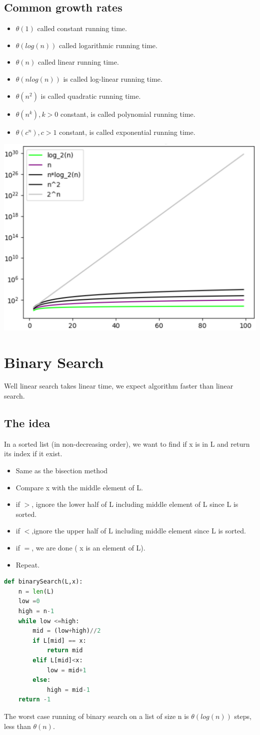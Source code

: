 \documentclass[12pt,oneside]{book}
\begin{document}
\subsection{Common growth rates}
\begin{itemize}
	\item $\theta(1)$ called constant running time.
	\item $\theta(log(n))$ called logarithmic running time.
	\item $\theta(n)$ called linear running time.
	\item $\theta(nlog(n))$ is called log-linear running time.
	\item $\theta(n^2)$ is called quadratic running time.
	\item $\theta(n^k),k>0$ constant, is called polynomial running time.
	\item $\theta(c^n),c>1$ constant, is called exponential running time.
\end{itemize}
\begin{center}
	\includegraphics[width=0.5\linewidth]{../pic/python/2.png}
\end{center}
\section{Binary Search}
Well linear search takes linear time, we expect algorithm faster than linear search.
\subsection{The idea}
In a sorted list (in non-decreasing order), we want to find if x is in L and return its index if it exist.
\begin{itemize}
	\item Same as the bisection method
	\item Compare x with the middle element of L.
	\item if $>$, ignore the lower half of L including middle element of L since L is sorted.
	\item if $<$,ignore the upper half of L including middle element since L is sorted.
	\item if $=$, we are done ( x is an element of L).
	\item Repeat.
\end{itemize}
{\small\begin{lstlisting}[language=python]
def binarySearch(L,x):
	n = len(L)
	low =0 
	high = n-1 
	while low <=high:
		mid = (low+high)//2
		if L[mid] == x: 
			return mid 
		elif L[mid]<x: 
			low = mid+1 
		else:
			high = mid-1
	return -1
\end{lstlisting}}
The worst case running of binary search on a list of size n is $\theta(log(n))$ steps, less than $\theta(n)$.
\end{document}
